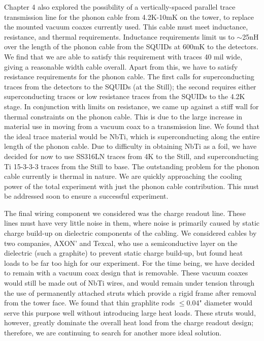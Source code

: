 \documentclass{report}
\begin{document}
Chapter 4 also explored the possibility of a vertically-spaced parallel trace transmission line for the phonon cable from 4.2K-10mK on the tower, to replace the mounted vacuum coaxes currently used. This cable must meet inductance, resistance, and thermal requirements. Inductance requirements limit us to $\sim$25nH over the length of the phonon cable from the SQUIDs at 600mK to the detectors. We find that we are able to satisfy this requirement with traces 40 mil wide, giving a reasonable width cable overall. Apart from this, we have to satisfy resistance requirements for the phonon cable. The first calls for superconducting traces from the detectors to the SQUIDs (at the Still); the second requires either superconducting traces or low resistance traces from the SQUIDs to the 4.2K stage. In conjunction with limits on resistance, we came up against a stiff wall for thermal constraints on the phonon cable. This is due to the large increase in material use in moving from a vacuum coax to a transmission line. We found that the ideal trace material would be NbTi, which is superconducting along the entire length of the phonon cable. Due to difficulty in obtaining NbTi as a foil, we have decided for now to use SS316LN traces from 4K to the Still, and superconducting Ti 15-3-3-3 traces from the Still to base. The outstanding problem for the phonon cable currently is thermal in nature. We are quickly approaching the cooling power of the total experiment with just the phonon cable contribution. This must be addressed soon to ensure a successful experiment. 

The final wiring component we considered was the charge readout line. These lines must have very little noise in them, where noise is primarily caused by static charge build-up on dielectric components of the cabling. We considered cables by two companies, AXON' and Texcal, who use a semiconductive layer on the dielectric (such a graphite) to prevent static charge build-up, but found heat loads to be far too high for our experiment. For the time being, we have decided to remain with a vacuum coax design that is removable. These vacuum coaxes would still be made out of NbTi wires, and would remain under tension through the use of permanently attached struts which provide a rigid frame after removal from the tower face. We found that thin graphlite rods $\leq$0.04" diameter would serve this purpose well without introducing large heat loads. These struts would, however, greatly dominate the overall heat load from the charge readout design; therefore, we are continuing to search for another more ideal solution.
\end{document}
